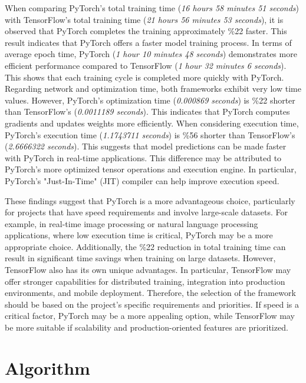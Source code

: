 \documentclass[conference]{IEEEtran}
\begin{document}
When comparing PyTorch's total training time (\textit{16 hours 58 minutes 51 seconds}) with TensorFlow's total training time (\textit{21 hours 56 minutes 53 seconds}), it is observed that PyTorch completes the training approximately \%22 faster. This result indicates that PyTorch offers a faster model training process. In terms of average epoch time, PyTorch (\textit{1 hour 10 minutes 48 seconds}) demonstrates more efficient performance compared to TensorFlow (\textit{1 hour 32 minutes 6 seconds}). This shows that each training cycle is completed more quickly with PyTorch. Regarding network and optimization time, both frameworks exhibit very low time values. However, PyTorch's optimization time (\textit{0.000869 seconds}) is \%22 shorter than TensorFlow's (\textit{0.0011189 seconds}). This indicates that PyTorch computes gradients and updates weights more efficiently. When considering execution time, PyTorch's execution time (\textit{1.1743711 seconds}) is \%56 shorter than TensorFlow's (\textit{2.6666322 seconds}). This suggests that model predictions can be made faster with PyTorch in real-time applications. This difference may be attributed to PyTorch's more optimized tensor operations and execution engine. In particular, PyTorch's "Just-In-Time" (JIT) compiler can help improve execution speed.

These findings suggest that PyTorch is a more advantageous choice, particularly for projects that have speed requirements and involve large-scale datasets. For example, in real-time image processing or natural language processing applications, where low execution time is critical, PyTorch may be a more appropriate choice. Additionally, the \%22 reduction in total training time can result in significant time savings when training on large datasets. However, TensorFlow also has its own unique advantages. In particular, TensorFlow may offer stronger capabilities for distributed training, integration into production environments, and mobile deployment. Therefore, the selection of the framework should be based on the project's specific requirements and priorities. If speed is a critical factor, PyTorch may be a more appealing option, while TensorFlow may be more suitable if scalability and production-oriented features are prioritized.


\section{Algorithm}
\end{document}
